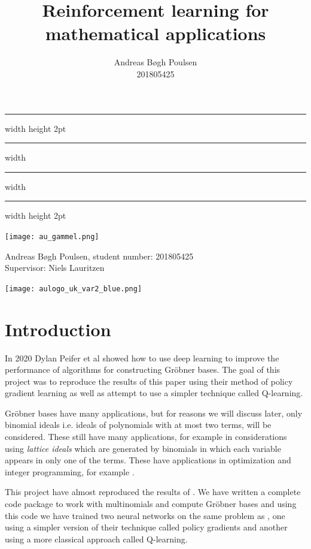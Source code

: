 \documentclass{article}
\title{Reinforcement learning for mathematical applications}
\author{
    Andreas Bøgh Poulsen\\
    201805425
}
\theoremstyle{changedot}
\theoremstyle{changedotbreak}
\theoremstyle{nonumberplain}
\begin{document}
\begin{titlepage}
  \center \sc
  \hrule width \hsize height 2pt \kern 1mm \hrule width \hsize
  \vspace{4mm}
  \vspace{6mm}
  \hrule width \hsize \kern 1mm \hrule width \hsize height 2pt
  \vspace{10mm}

  \vspace{10mm}

  \texttt{[image: au\_gammel.png]}

  \vspace{15mm}

  {\large Andreas Bøgh Poulsen, student number: 201805425 \\ Supervisor: Niels Lauritzen}

  \vspace{7mm}

  \texttt{[image: aulogo\_uk\_var2\_blue.png]}
\end{titlepage}


\section{Introduction}
In 2020 Dylan Peifer et al \cite{peifer} showed how to use deep learning to improve the performance of algorithms for constructing Gröbner bases. The goal of this project was to reproduce the results of this paper using their method of policy gradient learning as well as attempt to use a simpler technique called Q-learning.

Gröbner bases have many applications, but for reasons we will discuss later, only binomial ideals i.e. ideals of polynomials with at most two terms, will be considered. These still have many applications, for example in considerations using \emph{lattice ideals} which are generated by binomials in which each variable appears in only one of the terms. These have applications in optimization and integer programming, for example \cite{lattice}.

This project have almost reproduced the results of \cite{peifer}. We have written a complete code package to work with multinomials and compute Gröbner bases and using this code we have trained two neural networks on the same problem as \cite{peifer}, one using a simpler version of their technique called policy gradients and another using a more classical approach called Q-learning. 
\end{document}
